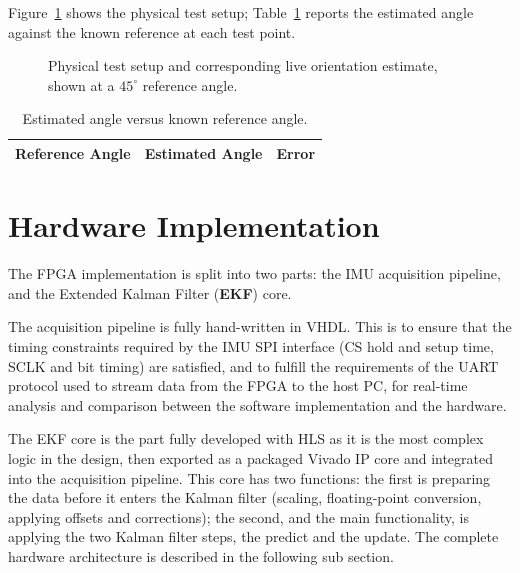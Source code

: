 \documentclass[12pt,a4paper]{article}
\begin{document}
{Figure~\ref{fig:known-angle-setup} shows the physical test setup;
Table~\ref{tab:known-angle-results} reports the estimated angle
against the known reference at each test point.

\begin{figure}[h]
  \centering
  \caption{Physical test setup and corresponding live orientation
  estimate, shown at a $45^{\circ}$ reference angle.}
  \label{fig:known-angle-setup}
\end{figure}

\begin{table}[h]
  \centering
  \caption{Estimated angle versus known reference angle.}
  \label{tab:known-angle-results}
  \begin{tabular}{ccc}
    \toprule
    \textbf{Reference Angle} & \textbf{Estimated Angle} & \textbf{Error} \\
    \midrule
    \bottomrule
  \end{tabular}
\end{table}


\clearpage
\section{Hardware Implementation}
\label{ch:hw-impl}
The FPGA implementation is split into two parts: the IMU
acquisition pipeline, and the Extended Kalman Filter (\textbf{EKF})
core.

The acquisition pipeline is fully hand-written in VHDL. This is to
ensure that the timing constraints required by the IMU SPI interface
(CS hold and setup time, SCLK and bit timing) are satisfied, and to
fulfill the requirements of the UART protocol used to stream data
from the FPGA to the host PC, for real-time analysis and comparison
between the software implementation and the hardware.

The EKF core is the part fully developed with HLS as it is the most complex logic in the design, then exported as a
packaged Vivado IP core and integrated into the acquisition
pipeline. This core has two functions: the first is preparing the
data before it enters the Kalman filter (scaling, floating-point
conversion, applying offsets and corrections); the second, and the
main functionality, is applying the two Kalman filter steps, the
predict and the update.  The complete hardware architecture is described in the following sub section.

}
\end{document}
